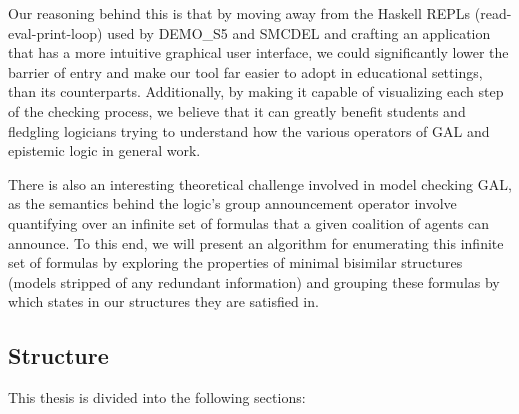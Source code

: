 Our reasoning behind this is that by moving away from the Haskell REPLs (read-eval-print-loop) used by DEMO\_S5 and SMCDEL and crafting an application that has a more intuitive graphical user interface, we could significantly lower the barrier of entry and make our tool far easier to adopt in educational settings, than its counterparts. Additionally, by making it capable of visualizing each step of the checking process, we believe that it can greatly benefit students and fledgling logicians trying to understand how the various operators of GAL and epistemic logic in general work. 

There is also an interesting theoretical challenge involved in model checking GAL, as the semantics behind the logic's group announcement operator involve quantifying over an infinite set of formulas that a given coalition of agents can announce. To this end, we will present an algorithm for enumerating this infinite set of formulas by exploring the properties of minimal bisimilar structures (models stripped of any redundant information) and grouping these formulas by which states in our structures they are satisfied in. 




\subsection{Structure}

This thesis is divided into the following sections: 

